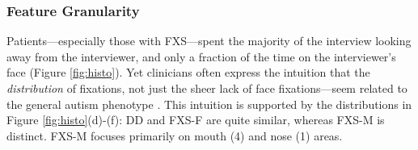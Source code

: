 \documentclass[10pt,twocolumn,letterpaper]{article}
\begin{document}
\subsubsection{Feature Granularity}

Patients---especially those with FXS---spent the majority of the interview looking away from the interviewer, and only a fraction of the time on the interviewer's face (Figure \ref{fig:histo}). Yet clinicians often express the intuition that the \emph{distribution} of fixations, not just the sheer lack of face fixations---seem related to the general autism phenotype \cite{klin2002,jones2013}. This intuition is supported by the distributions in Figure \ref{fig:histo}(d)-(f): DD and FXS-F are quite similar, whereas FXS-M is distinct. FXS-M focuses primarily on mouth (4) and nose (1) areas. 
\end{document}
